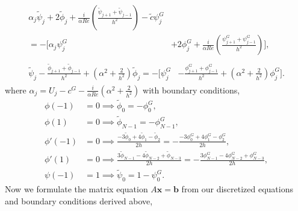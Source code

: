 \documentclass[a4paper, 12pt, twoside, openright]{article}
\numberwithin{equation}{section}
\begin{document}
\begin{align}
\begin{split}
\alpha_j\tilde \psi_j + 2\tilde \phi_j + \frac{i}{\alpha Re}\left(\frac{\tilde \psi_{j+1} + \tilde \psi_{j-1}}{h^2}\right) - \tilde c\psi^{G}_j \\=- \Biggl[ \alpha_j\psi^{G}_j &+ 2\phi^{G}_j + \frac{i}{\alpha Re}\left(\frac{ \psi^{G}_{j+1}+\psi^{G}_{j-1}}{h^2} \right)  \Biggr],
\end{split}\\
\begin{split}
\tilde \psi_j - \frac{\tilde \phi_{j+1} + \tilde \phi_{j-1}}{h^2}+ \left(\alpha^2 + \frac{2}{h^2}\right)\tilde \phi_j = - \Biggl[ \psi^{G}_j &- \frac{\phi^{G}_{j+1} + \phi^{G}_{j-1}}{h^2}+\left(\alpha^2+\frac{2}{h^2}\right)\phi^{G}_j \Biggr].
\end{split}
\end{align}
where $\alpha_j = U_j - c^{G}-\frac{i}{\alpha Re}\left(\alpha^2+\frac{2}{h^2}\right)$ with boundary conditions,
\begin{align}
\phi(-1) &= 0 \implies \tilde \phi_0 = - \phi^{G}_0, \nonumber\\
\phi(1) &= 0 \implies \tilde \phi_{N-1}= - \phi^{G}_{N-1}, \nonumber\\
\phi'(-1) &= 0 \implies \frac{-3\tilde \phi_0 + 4\tilde \phi_1-\tilde \phi_2}{2h} = - \frac{-3\phi^{G}_0+4\phi^{G}_1 - \phi^{G}_2}{2h},\nonumber\\
\phi'(1) &= 0 \implies \frac{3\tilde\phi_{N-1} - 4\tilde\phi_{N-2}+\tilde\phi_{N-3}}{2h} = -\frac{3\phi^{G}_{N-1} - 4\phi^{G}_{N-2}+\phi^{G}_{N-3}}{2h},\nonumber\\
\psi(-1) &= 1 \implies \tilde\psi_0 = 1 - \psi^{G}_0.
\end{align}
Now we formulate the matrix equation $A\mathbf{x}=\mathbf{b}$ from our discretized equations and boundary conditions derived above,
\end{document}
